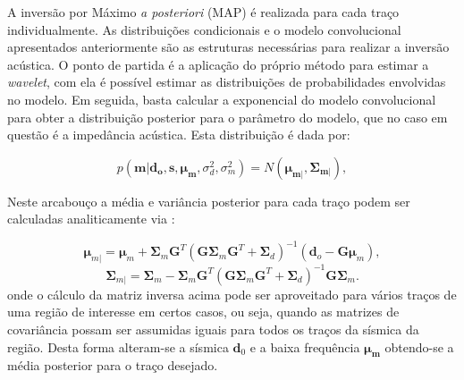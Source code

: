 {%



% 

A inversão por Máximo \textit{a posteriori} (MAP)
\citep{Buland01012003,leandroGRSL} é realizada para cada traço individualmente.
As distribuições condicionais e o modelo convolucional apresentados anteriormente
são as estruturas necessárias para realizar a inversão acústica. O ponto de partida
é a aplicação do próprio método para estimar a \textit{wavelet},
com ela é possível estimar as distribuições de probabilidades envolvidas no modelo.
Em seguida, basta calcular a exponencial do modelo convolucional para obter a distribuição posterior
para o parâmetro do modelo, que no caso em questão é a impedância acústica. Esta distribuição é dada por:

\begin{equation}
p(\boldsymbol{m}|\boldsymbol{d_{o}},\boldsymbol{s},\boldsymbol{\mu_{m}},\sigma_{d}^{2},\sigma_{m}^{2}) = 
N(\boldsymbol{\mu_{m|}},\boldsymbol{\Sigma_{m|}}),
\end{equation} 

Neste arcabouço a média e variância posterior para cada traço podem ser
calculadas analiticamente via \citep{leandroGRSL}:

\begin{equation}
\label{eqn:mapSolution}
\boldsymbol{\mu}_{m|} = \boldsymbol{\mu}_{m} + \boldsymbol{\Sigma}_{m}\boldsymbol{G}^{T}(\boldsymbol{G\Sigma}_{m}\boldsymbol{G}^{T}+\boldsymbol{\Sigma}_{d})^{-1}\left ( \boldsymbol{d}_{o} - \boldsymbol{G\mu}_{m} \right ),
\end{equation}
\begin{equation}
\boldsymbol{\Sigma}_{m|} = \boldsymbol{\Sigma}_{m} - \boldsymbol{\Sigma}_{m}\boldsymbol{G}^{T}(\boldsymbol{G\Sigma}_{m}\boldsymbol{G}^{T}+\boldsymbol{\Sigma}_{d})^{-1}\boldsymbol{G\Sigma}_{m}.
\end{equation} 
onde o cálculo da matriz inversa acima pode ser aproveitado para vários traços
de uma região de interesse em certos casos, ou seja, quando as matrizes de
covariância possam ser assumidas iguais para todos os traços da sísmica da região.
Desta forma alteram-se a sísmica $\mathbf{d}_0$ e a baixa frequência
$\boldsymbol{\mu_m}$ obtendo-se a média posterior para o traço desejado.
  
}
